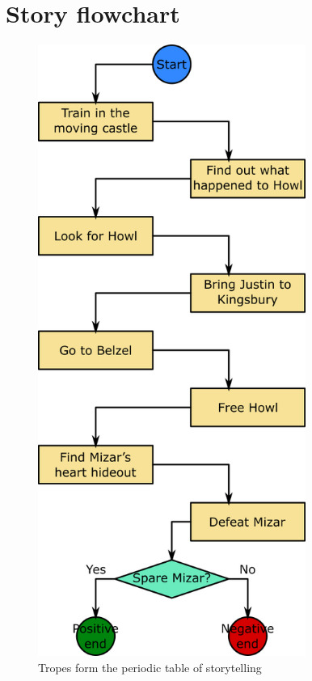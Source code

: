 \section{Story flowchart}

\begin{figure}[H]
  \centering
  \includegraphics[width=\textwidth,height=20cm,keepaspectratio]{Images/SVG/Exported/storyFlowchart}
  \caption{Tropes form the periodic table of storytelling}
\end{figure}
